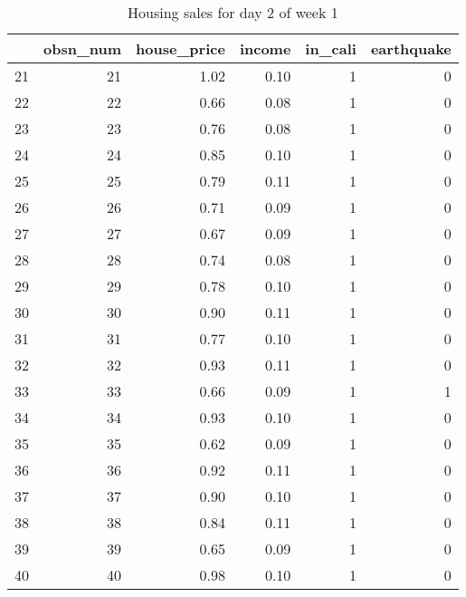 \begin{table}[ht]
\centering
\begin{tabular}{rrrrrr}
  \hline
 & obsn\_num & house\_price & income & in\_cali & earthquake \\ 
  \hline
21 &  21 & 1.02 & 0.10 &   1 &   0 \\ 
  22 &  22 & 0.66 & 0.08 &   1 &   0 \\ 
  23 &  23 & 0.76 & 0.08 &   1 &   0 \\ 
  24 &  24 & 0.85 & 0.10 &   1 &   0 \\ 
  25 &  25 & 0.79 & 0.11 &   1 &   0 \\ 
  26 &  26 & 0.71 & 0.09 &   1 &   0 \\ 
  27 &  27 & 0.67 & 0.09 &   1 &   0 \\ 
  28 &  28 & 0.74 & 0.08 &   1 &   0 \\ 
  29 &  29 & 0.78 & 0.10 &   1 &   0 \\ 
  30 &  30 & 0.90 & 0.11 &   1 &   0 \\ 
  31 &  31 & 0.77 & 0.10 &   1 &   0 \\ 
  32 &  32 & 0.93 & 0.11 &   1 &   0 \\ 
  33 &  33 & 0.66 & 0.09 &   1 &   1 \\ 
  34 &  34 & 0.93 & 0.10 &   1 &   0 \\ 
  35 &  35 & 0.62 & 0.09 &   1 &   0 \\ 
  36 &  36 & 0.92 & 0.11 &   1 &   0 \\ 
  37 &  37 & 0.90 & 0.10 &   1 &   0 \\ 
  38 &  38 & 0.84 & 0.11 &   1 &   0 \\ 
  39 &  39 & 0.65 & 0.09 &   1 &   0 \\ 
  40 &  40 & 0.98 & 0.10 &   1 &   0 \\ 
   \hline
\end{tabular}
\caption{Housing sales for day 2 of week 1} 
\end{table}
